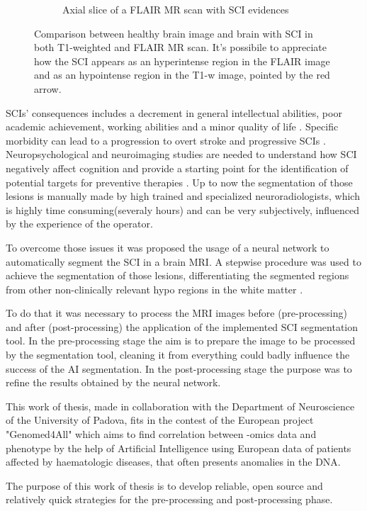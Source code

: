 \documentclass{standalone}
\begin{document}
\begin{figure}[h!]
\begin{subfigure}[b]{0.45\textwidth}
             \caption{Axial slice of a FLAIR MR scan with SCI evidences}
             \label{fig:SCI_flair}
        \end{subfigure}
		\caption{Comparison between healthy brain image and brain with SCI in both T1-weighted and FLAIR MR scan. It's possibile to appreciate how the SCI appears as an hyperintense region in the FLAIR image and as an hypointense region in the T1-w image, pointed by the red arrow.}
		\label{fig:HealthVSLesion}
	\end{figure} 


SCIs' consequences includes a decrement in general intellectual abilities, poor academic achievement, working abilities and a minor quality of life \cite{ART:Debaun}. Specific morbidity can lead to a progression to overt stroke and progressive SCIs \cite{ART:Debaun, ART:Biondini}.
Neuropsychological and neuroimaging studies are needed to understand how SCI negatively affect cognition and provide a starting point for the identification of potential targets for preventive therapies \cite{ART:Howing}.
Up to now the segmentation of those lesions is manually made by high trained and specialized neuroradiologists, which is highly time consuming(severaly hours) and can be very subjectively, influenced by the experience of the operator.


To overcome those issues it was proposed the usage of a neural network to automatically segment the SCI in a brain MRI. 
A stepwise procedure was used to achieve the segmentation of those lesions, differentiating the segmented regions from other non-clinically relevant hypo regions in the white matter \cite{ART:Biondini}.

To do that it was necessary to process the MRI images before (pre-processing) and after (post-processing) the application of the implemented SCI segmentation tool.
In the pre-processing stage the aim is to prepare the image to be processed by the segmentation tool, cleaning it from everything could badly influence the success of the AI segmentation.
In the post-processing stage the purpose was to refine the results obtained by the neural network.

This work of thesis, made in collaboration with the Department of Neuroscience of the University of Padova, fits in the contest of the European project "Genomed4All"\cite{Genomed4All} which aims to find correlation between -omics data and phenotype by the help of Artificial Intelligence \cite{Humanitas} using European data of patients affected by haematologic diseases, that often presents anomalies in the DNA.

The purpose of this work of thesis is to develop reliable, open source and relatively quick strategies for the pre-processing and post-processing phase.



\end{document}
